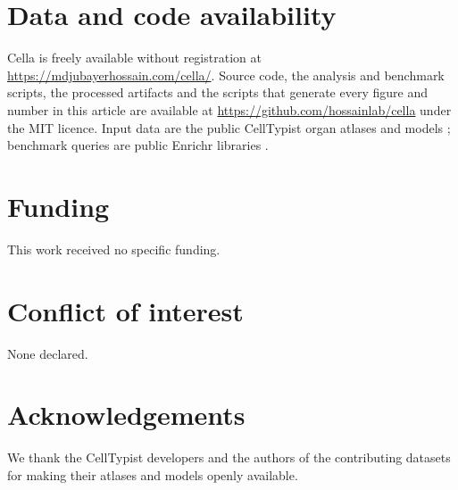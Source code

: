 \documentclass[11pt]{article}
\newcommand{\cella}{Cella}
\begin{document}
\section*{Data and code availability}

\cella{} is freely available without registration at \url{https://mdjubayerhossain.com/cella/}. Source code, the analysis and benchmark scripts, the processed artifacts and the scripts that generate every figure and number in this article are available at \url{https://github.com/hossainlab/cella} under the MIT licence. Input data are the public CellTypist organ atlases and models \cite{celltypistorgans}; benchmark queries are public Enrichr libraries \cite{kuleshov2016}. %

\section*{Funding}

This work received no specific funding.

\section*{Conflict of interest}

None declared.

\section*{Acknowledgements}

We thank the CellTypist developers and the authors of the contributing datasets for making their atlases and models openly available.



\end{document}
